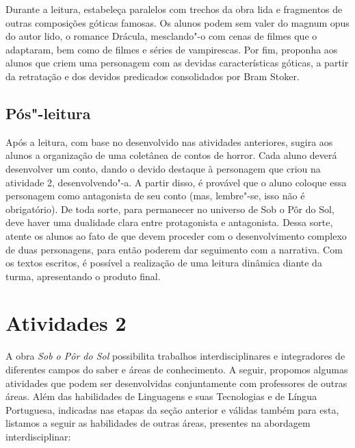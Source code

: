 \documentclass[12pt]{extarticle}
\begin{document}

Durante a leitura, estabeleça paralelos com trechos da obra
lida e fragmentos de outras composições góticas famosas. Os alunos podem
sem valer do magnum opus do autor lido, o romance Drácula, mesclando"-o
com cenas de filmes que o adaptaram, bem como de filmes e séries de
vampirescas. Por fim, proponha aos alunos que criem uma personagem com
as devidas características góticas, a partir da retratação e dos devidos
predicados consolidados por Bram Stoker.


\subsection{Pós"-leitura}


Após a leitura, com base no desenvolvido nas atividades
anteriores, sugira aos alunos a organização de uma coletânea de contos
de horror. Cada aluno deverá desenvolver um conto, dando o devido
destaque à personagem que criou na atividade 2, desenvolvendo"-a. A
partir disso, é provável que o aluno coloque essa personagem como
antagonista de seu conto (mas, lembre"-se, isso não é obrigatório). De
toda sorte, para permanecer no universo de Sob o Pôr do Sol, deve haver
uma dualidade clara entre protagonista e antagonista. Dessa sorte,
atente os alunos ao fato de que devem proceder com o desenvolvimento
complexo de duas personagens, para então poderem dar seguimento com a
narrativa. Com os textos escritos, é possível a realização de uma
leitura dinâmica diante da turma, apresentando o produto final.


\section{Atividades 2}

A obra \emph{Sob o Pôr do Sol} possibilita trabalhos interdisciplinares
e integradores de diferentes campos do saber e áreas de conhecimento. A
seguir, propomos algumas atividades que podem ser desenvolvidas
conjuntamente com professores de outras áreas. Além das habilidades de
Linguagens e suas Tecnologias e de Língua Portuguesa, indicadas nas
etapas da seção anterior e válidas também para esta, listamos a seguir
as habilidades de outras áreas, presentes na abordagem interdisciplinar:
\end{document}
